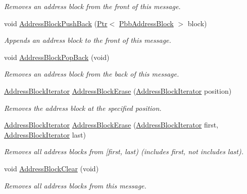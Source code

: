 \begin{DoxyCompactItemize}
\begin{DoxyCompactList}\small\item\em Removes an address block from the front of this message. \end{DoxyCompactList}\item 
void \hyperlink{classns3_1_1PbbMessage_a5f623bad2fb1adde7da885e1c92d5311}{Address\+Block\+Push\+Back} (\hyperlink{classns3_1_1Ptr}{Ptr}$<$ \hyperlink{classns3_1_1PbbAddressBlock}{Pbb\+Address\+Block} $>$ block)
\begin{DoxyCompactList}\small\item\em Appends an address block to the front of this message. \end{DoxyCompactList}\item 
void \hyperlink{classns3_1_1PbbMessage_af7cfd2c9e0930df1146a37e6fb8b0dd8}{Address\+Block\+Pop\+Back} (void)
\begin{DoxyCompactList}\small\item\em Removes an address block from the back of this message. \end{DoxyCompactList}\item 
\hyperlink{classns3_1_1PbbMessage_a9ab666cb1f964e91878353ded8a8f303}{Address\+Block\+Iterator} \hyperlink{classns3_1_1PbbMessage_ab80d437f66e5217728b6071ea4610090}{Address\+Block\+Erase} (\hyperlink{classns3_1_1PbbMessage_a9ab666cb1f964e91878353ded8a8f303}{Address\+Block\+Iterator} position)
\begin{DoxyCompactList}\small\item\em Removes the address block at the specified position. \end{DoxyCompactList}\item 
\hyperlink{classns3_1_1PbbMessage_a9ab666cb1f964e91878353ded8a8f303}{Address\+Block\+Iterator} \hyperlink{classns3_1_1PbbMessage_ac89eeec5cd156a648ec5f90f3ef4e8b6}{Address\+Block\+Erase} (\hyperlink{classns3_1_1PbbMessage_a9ab666cb1f964e91878353ded8a8f303}{Address\+Block\+Iterator} first, \hyperlink{classns3_1_1PbbMessage_a9ab666cb1f964e91878353ded8a8f303}{Address\+Block\+Iterator} last)
\begin{DoxyCompactList}\small\item\em Removes all address blocks from \mbox{[}first, last) (includes first, not includes last). \end{DoxyCompactList}\item 
void \hyperlink{classns3_1_1PbbMessage_aa484e11d9b83ca8bb250dbc20392a6db}{Address\+Block\+Clear} (void)
\begin{DoxyCompactList}\small\item\em Removes all address blocks from this message. \end{DoxyCompactList}\item 

\end{DoxyCompactItemize}
